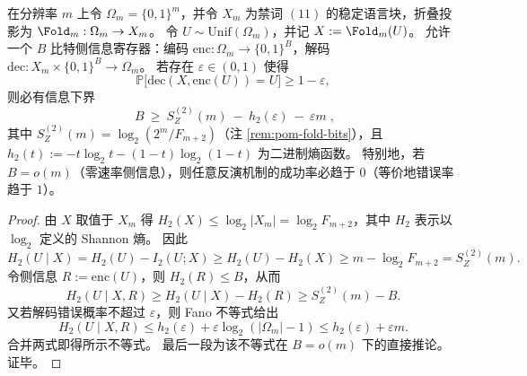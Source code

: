 \begin{theorem}\label{thm:pom-fold-inversion-zero-rate-strong-converse}
在分辨率 \(m\) 上令 \(\Omega_m=\{0,1\}^m\)，并令 \(X_m\) 为禁词 \((11)\) 的稳定语言块，折叠投影为 \(\Fold_m:\Omega_m\to X_m\)。
令 \(U\sim\mathrm{Unif}(\Omega_m)\)，并记 \(X:=\Fold_m(U)\)。
允许一个 \(B\) 比特侧信息寄存器：编码 \(\mathrm{enc}:\Omega_m\to\{0,1\}^B\)，解码 \(\mathrm{dec}:X_m\times\{0,1\}^B\to\Omega_m\)。
若存在 \(\varepsilon\in(0,1)\) 使得
\[
\mathbb P\bigl[\mathrm{dec}(X,\mathrm{enc}(U))=U\bigr]\ge 1-\varepsilon,
\]
则必有信息下界
\[
\boxed{\;
B\ \ge\ S_Z^{(2)}(m)\ -\ h_2(\varepsilon)\ -\ \varepsilon m\; },
\]
其中 \(S_Z^{(2)}(m)=\log_2(2^m/F_{m+2})\)（注 \ref{rem:pom-fold-bits}），且 \(h_2(t):=-t\log_2 t-(1-t)\log_2(1-t)\) 为二进制熵函数。
特别地，若 \(B=o(m)\)（零速率侧信息），则任意反演机制的成功率必趋于 \(0\)（等价地错误率趋于 \(1\)）。
\end{theorem}

\begin{proof}
由 \(X\) 取值于 \(X_m\) 得 \(H_2(X)\le \log_2|X_m|=\log_2 F_{m+2}\)，其中 \(H_2\) 表示以 \(\log_2\) 定义的 Shannon 熵。
因此
\[
H_2(U\mid X)=H_2(U)-I_2(U;X)\ge H_2(U)-H_2(X)\ge m-\log_2F_{m+2}=S_Z^{(2)}(m).
\]
令侧信息 \(R:=\mathrm{enc}(U)\)，则 \(H_2(R)\le B\)，从而
\[
H_2(U\mid X,R)\ge H_2(U\mid X)-H_2(R)\ge S_Z^{(2)}(m)-B.
\]
又若解码错误概率不超过 \(\varepsilon\)，则 Fano 不等式给出
\[
H_2(U\mid X,R)\le h_2(\varepsilon)+\varepsilon\log_2(|\Omega_m|-1)\le h_2(\varepsilon)+\varepsilon m.
\]
合并两式即得所示不等式。
最后一段为该不等式在 \(B=o(m)\) 下的直接推论。证毕。
\end{proof}

\endinput
